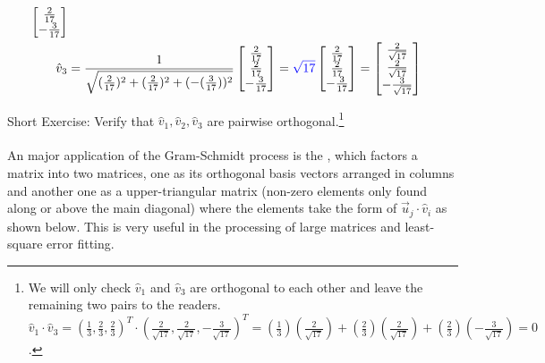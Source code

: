 \begin{solution}
\begin{align*}
\begin{bmatrix}
\frac{2}{17} \\
-\frac{3}{17}
\end{bmatrix}
\\
\hat{v}_3 &=  \frac{1}{\sqrt{(\frac{2}{17})^2 + (\frac{2}{17})^2 + (-(\frac{3}{17}))^2}}
\begin{bmatrix}
\frac{2}{17} \\
\frac{2}{17} \\
-\frac{3}{17}
\end{bmatrix}
=
\textcolor{blue}{\sqrt{17}}
\begin{bmatrix}
\frac{2}{17} \\
\frac{2}{17} \\
-\frac{3}{17}
\end{bmatrix}
=
\begin{bmatrix}
\frac{2}{\sqrt{17}} \\
\frac{2}{\sqrt{17}} \\
-\frac{3}{\sqrt{17}}
\end{bmatrix}
\end{align*}
\end{solution}
Short Exercise: Verify that $\hat{v}_1, \hat{v}_2, \hat{v}_3$ are pairwise orthogonal.\footnote{We will only check $\hat{v}_1$ and $\hat{v}_3$ are orthogonal to each other and leave the remaining two pairs to the readers. $\hat{v}_1 \cdot \hat{v}_3 = (\frac{1}{3}, \frac{2}{3}, \frac{2}{3})^T \cdot (\frac{2}{\sqrt{17}}, \frac{2}{\sqrt{17}}, -\frac{3}{\sqrt{17}})^T = (\frac{1}{3})(\frac{2}{\sqrt{17}}) + (\frac{2}{3})(\frac{2}{\sqrt{17}}) + (\frac{2}{3})(-\frac{3}{\sqrt{17}}) = 0$.} \\
\\
An major application of the Gram-Schmidt process is the , which factors a matrix into two matrices, one as its orthogonal basis vectors arranged in columns and another one as a upper-triangular matrix (non-zero elements only found along or above the main diagonal) where the elements take the form of $\vec{u}_j \cdot \hat{v}_i$ as shown below. This is very useful in the processing of large matrices and least-square error fitting.

